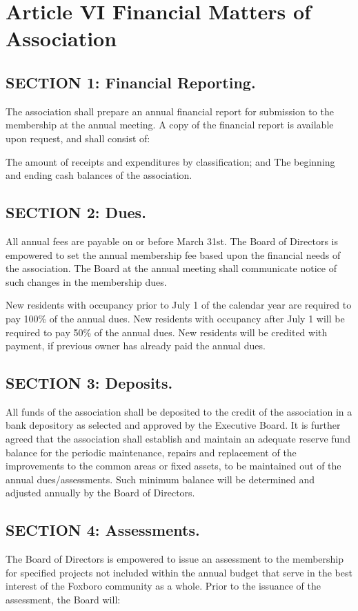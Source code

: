 \section{Article VI Financial Matters of Association}

\subsection{SECTION 1: Financial Reporting.}
The association shall prepare an annual financial report for submission
to the membership at the annual meeting. A copy of the financial report
is available upon request, and shall consist of:

The amount of receipts and expenditures by classification; and
The beginning and ending cash balances of the association.

\subsection{SECTION 2: Dues.}

All annual fees are payable on or before March 31st.  The Board of
Directors is empowered to set the annual membership fee based upon the
financial needs of the association. The Board at the annual meeting
shall communicate notice of such changes in the membership dues.

New residents with occupancy prior to July 1 of the calendar year are
required to pay 100\% of the annual dues. New residents with occupancy
after July 1 will be required to pay 50\% of the annual dues. New
residents will be credited with payment, if previous owner has already
paid the annual dues.



\subsection{SECTION 3: Deposits.}

All funds of the association shall be deposited to the credit of the
association in a bank depository as selected and approved by the Executive
Board. It is further agreed that the association shall establish and
maintain an adequate reserve fund balance for the periodic maintenance,
repairs and replacement of the improvements to the common areas or
fixed assets, to be maintained out of the annual dues/assessments. Such
minimum balance will be determined and adjusted annually by the Board
of Directors.

\subsection{SECTION 4: Assessments.}
The Board of Directors is empowered to issue an assessment to the
membership for specified projects not included within the annual budget
that serve in the best interest of the Foxboro community as a whole. Prior
to the issuance of the assessment, the Board will:


